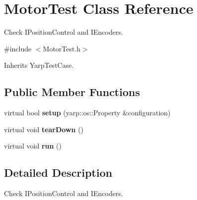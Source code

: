 \section{Motor\-Test Class Reference}
\label{classMotorTest}


Check I\-Position\-Control and I\-Encoders.  




{\ttfamily \#include $<$Motor\-Test.\-h$>$}



Inherits Yarp\-Test\-Case.

\subsection*{Public Member Functions}
\begin{DoxyCompactItemize}
\item 
virtual bool {\bfseries setup} (yarp\-::os\-::\-Property \&configuration)\label{classMotorTest_a899f7015f4c982fd25b0a2de4d693562}

\item 
virtual void {\bfseries tear\-Down} ()\label{classMotorTest_a35093fc16f2160699a962e2e600d12f7}

\item 
virtual void {\bfseries run} ()\label{classMotorTest_a7f262c968aa26e60b2d654fa0f3b6d1a}

\end{DoxyCompactItemize}


\subsection{Detailed Description}
Check I\-Position\-Control and I\-Encoders. 

